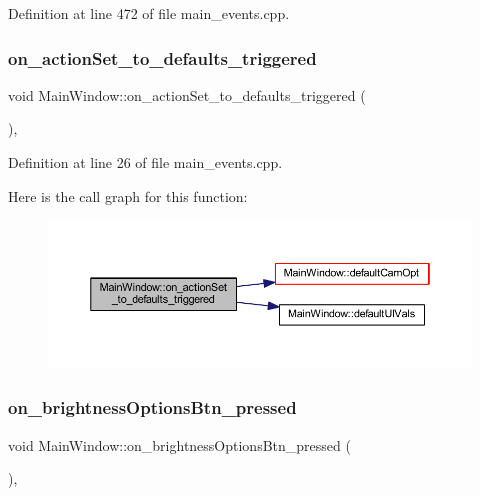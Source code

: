 Definition at line 472 of file main\+\_\+events.\+cpp.

\mbox{\label{class_main_window_a3292a73fad4dfd479598ea5166e293c9}} 
\subsubsection{\texorpdfstring{on\_actionSet\_to\_defaults\_triggered}{on\_actionSet\_to\_defaults\_triggered}}
{\footnotesize\ttfamily void Main\+Window\+::on\+\_\+action\+Set\+\_\+to\+\_\+defaults\+\_\+triggered (\begin{DoxyParamCaption}{ }\end{DoxyParamCaption})\hspace{0.3cm}{\ttfamily [private]}, {\ttfamily [slot]}}



Definition at line 26 of file main\+\_\+events.\+cpp.

Here is the call graph for this function\+:
\nopagebreak
\begin{figure}[H]
\begin{center}
\leavevmode
\includegraphics[width=350pt]{class_main_window_a3292a73fad4dfd479598ea5166e293c9_cgraph}
\end{center}
\end{figure}
\mbox{\label{class_main_window_a8b3a042f694a5013ad5e65253bc3a0ae}} 
\subsubsection{\texorpdfstring{on\_brightnessOptionsBtn\_pressed}{on\_brightnessOptionsBtn\_pressed}}
{\footnotesize\ttfamily void Main\+Window\+::on\+\_\+brightness\+Options\+Btn\+\_\+pressed (\begin{DoxyParamCaption}{ }\end{DoxyParamCaption})\hspace{0.3cm}{\ttfamily [private]}, {\ttfamily [slot]}}



